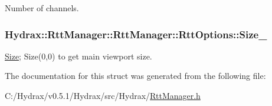 Number of channels. 

\hypertarget{struct_hydrax_1_1_rtt_manager_1_1_rtt_options_bfc4ca83d30b2cb28bc476d9b0c8aa2c}{
\subsubsection[{Size\_\-}]{ Hydrax::RttManager::RttManager::RttOptions::Size\_\-}}
\label{struct_hydrax_1_1_rtt_manager_1_1_rtt_options_bfc4ca83d30b2cb28bc476d9b0c8aa2c}


\hyperlink{struct_hydrax_1_1_size}{Size}; Size(0,0) to get main viewport size. 



The documentation for this struct was generated from the following file:\begin{CompactItemize}
\item 
C:/Hydrax/v0.5.1/Hydrax/src/Hydrax/\hyperlink{_rtt_manager_8h}{RttManager.h}\end{CompactItemize}
